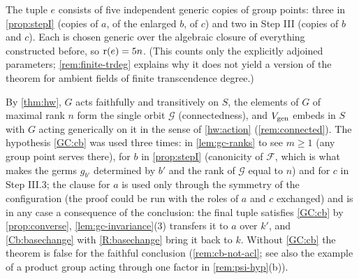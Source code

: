 \begin{remark}\label{rem:params}
The tuple $e$ consists of five independent generic copies of group points: three in
\cref{prop:stepI} (copies of $a$, of the enlarged $b$, of $c$) and two in Step III
(copies of $b$ and $c$).  Each is chosen generic over the algebraic closure of
everything constructed before, so $\operatorname{r}(e)=5n$.  (This counts only the explicitly
adjoined parameters; \cref{rem:finite-trdeg} explains why it does not yield a version
of the theorem for ambient fields of finite transcendence degree.)
\end{remark}

\begin{remark}\label{rem:main-props}
By \cref{thm:hw}, $G$ acts faithfully and transitively on $S$, the elements of $G$ of
maximal rank $n$ form the single orbit $\mathcal G$ (connectedness), and $V_{\operatorname{gen}}$ embeds
in $S$ with $G$ acting generically on it in the sense of \ref{hw:action}
(\cref{rem:connected}).  The hypothesis
\ref{GC:cb} was used three times: in \cref{lem:gc-ranks} to see $m\ge1$ (any group
point serves there), for $b$ in \cref{prop:stepI} (canonicity of
$\mathcal F$, which is what makes the germs $g_{b'}$ determined by $b'$ and the rank of
$\mathcal G$ equal to $n$) and for $c$ in Step III.3; the clause for $a$ is used only
through the symmetry of the configuration (the proof could be run with the roles of
$a$ and $c$ exchanged) and is in any case a consequence of the conclusion: the final
tuple satisfies \ref{GC:cb} by \cref{prop:converse}, \cref{lem:gc-invariance}(3)
transfers it to $a$ over $k'$, and \ref{Cb:basechange} with \ref{R:basechange} bring it
back to $k$.  Without
\ref{GC:cb} the theorem is false for the faithful conclusion (\cref{rem:cb-not-acl}; see
also the example of a product group acting through one factor in
\cref{rem:psi-hyp}(b)).
\end{remark}
